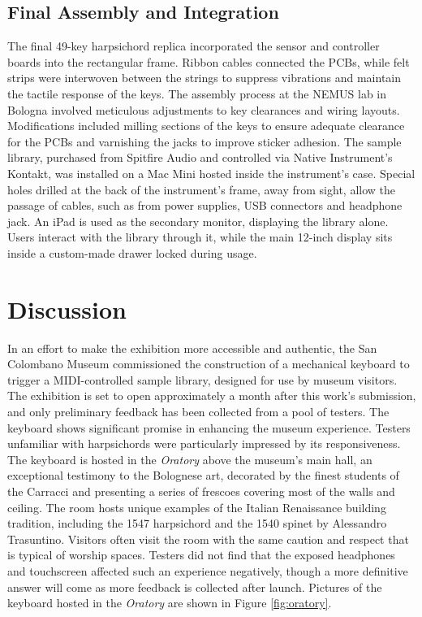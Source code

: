 \subsection{Final Assembly and Integration}

The final 49-key harpsichord replica incorporated the sensor and controller boards into the rectangular frame. Ribbon cables connected the PCBs, while felt strips were interwoven between the strings to suppress vibrations and maintain the tactile response of the keys. The assembly process at the NEMUS lab in Bologna involved meticulous adjustments to key clearances and wiring layouts. Modifications included milling sections of the keys to ensure adequate clearance for the PCBs and varnishing the jacks to improve sticker adhesion. The sample library, purchased from Spitfire Audio and controlled via Native Instrument's Kontakt, was installed on a Mac Mini hosted inside the instrument's case. Special holes drilled at the back of the instrument's frame, away from sight, allow the passage of cables, such as from power supplies, USB connectors and headphone jack. An iPad is used as the secondary monitor, displaying the library alone. Users interact with the library through it, while the main 12-inch display sits inside a custom-made drawer locked during usage.



\section{Discussion}\label{context}


In an effort to make the exhibition more accessible and authentic, the San Colombano Museum commissioned the construction of a mechanical keyboard to trigger a MIDI-controlled sample library, designed for use by museum visitors. The exhibition is set to open approximately a month after this work's submission, and only preliminary feedback has been collected from a pool of testers. The keyboard shows significant promise in enhancing the museum experience. Testers unfamiliar with harpsichords were particularly impressed by its responsiveness. The keyboard is hosted in the \emph{Oratory} above the museum's main hall, an exceptional testimony to the Bolognese art, decorated by the finest students of the Carracci and presenting a series of frescoes covering most of the walls and ceiling. The room hosts unique examples of the Italian Renaissance building tradition, including the 1547 harpsichord and the 1540 spinet by Alessandro Trasuntino. Visitors often visit the room with the same caution and respect that is typical of worship spaces. Testers did not find that the exposed headphones and touchscreen affected such an experience negatively, though a more definitive answer will come as more feedback is collected after launch. Pictures of the keyboard hosted in the \emph{Oratory} are shown in Figure \ref{fig:oratory}.

